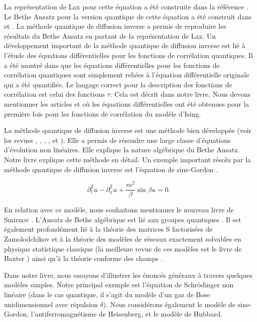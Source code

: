 La représentation de Lax pour cette équation a été construite dans la référence \cite{??}. Le Bethe Ansatz pour la version quantique de cette équation a été construit dans \cite{??} et \cite{??}. La méthode quantique de diffusion inverse a permis de reproduire les résultats du Bethe Ansatz en partant de la représentation de Lax. Un développement important de la méthode quantique de diffusion inverse est lié à l'étude des équations différentielles pour les fonctions de corrélation quantiques. Il a été montré dans \cite{??} que les équations différentielles pour les fonctions de corrélation quantiques sont simplement reliées à l'équation différentielle originale qui a été quantifiée. Le langage correct pour la description des fonctions de corrélation est celui des fonctions $\tau$. Cela est décrit dans notre livre. Nous devons mentionner les articles \cite{??} et \cite{??} où les équations différentielles ont été obtenues pour la première fois pour les fonctions de corrélation du modèle d'Ising.

La méthode quantique de diffusion inverse est une méthode bien développée (voir les revues \cite{??}, \cite{??}, \cite{??}, \cite{??}, et \cite{??}). Elle a permis de résoudre une large classe d'équations d'évolution non linéaires. Elle explique la nature algébrique du Bethe Ansatz. Notre livre explique cette méthode en détail. Un exemple important résolu par la méthode quantique de diffusion inverse est l'équation de sine-Gordon \cite{??}.


$$\partial_t^2 u - \partial_x^2 u + \frac{m^2}{\beta} \sin \beta u = 0 .$$

En relation avec ce modèle, nous souhaitons mentionner le nouveau livre de Smirnov \cite{Smirnov53}. L'Ansatz de Bethe algébrique est lié aux groupes quantiques \cite{QuantumGroups17}. Il est également profondément lié à la théorie des matrices S factorisées de Zamolodchikov \cite{Zamolodchikov62} et à la théorie des modèles de réseaux exactement solvables en physique statistique classique (la meilleure revue de ces modèles est le livre de Baxter \cite{Baxter5}) ainsi qu'à la théorie conforme des champs \cite{CFT6,CFT30}.

Dans notre livre, nous essayons d'illustrer les énoncés généraux à travers quelques modèles simples. Notre principal exemple est l'équation de Schrödinger non linéaire (dans le cas quantique, il s'agit du modèle d'un gaz de Bose unidimensionnel avec répulsion $\delta$). Nous considérons également le modèle de sine-Gordon, l'antiferromagnétisme de Heisenberg, et le modèle de Hubbard.


